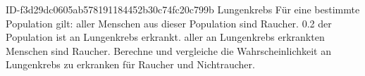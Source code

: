 \begin{exercise}
      {ID-f3d29dc0605ab578191184452b30c74fc20c799b}
      {Lungenkrebs}
  \ifproblem\problem
    Für eine bestimmte Population gilt:  aller Menschen aus dieser Population
    sind Raucher. \num{0.2} der Population ist an Lungenkrebs erkrankt.  aller
    an Lungenkrebs erkrankten Menschen sind Raucher. Berechne und vergleiche die
    Wahrscheinlichkeit an Lungenkrebs zu erkranken für Raucher und Nichtraucher.
  \fi
\end{exercise}
